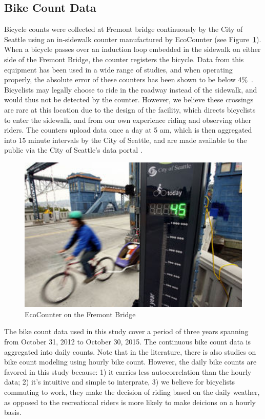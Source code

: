 \documentclass [11pt, proquest] {uwthesis}[2015/03/03]
\begin{document}
\subsection{Bike Count Data}
Bicycle counts were collected at Fremont bridge continuously by the City of Seattle using an in-sidewalk counter manufactured by EcoCounter (see Figure~\ref{fig:ecoCounter}). When a bicycle passes over an induction loop embedded in the sidewalk on either side of the Fremont Bridge, the counter
registers the bicycle. Data from this equipment has been used in a wide range of studies, and when operating properly, the absolute error of these counters has been shown to be below 4\%~\cite{Nordback09}. Bicyclists may legally choose to ride in the roadway instead of the sidewalk, and would thus not be detected by the counter. However, we believe these crossings are rare at this location due to the design of the facility, which directs bicyclists to enter the sidewalk, and from our own experience riding and observing other riders. The counters upload data once a day at 5 am, which is then aggregated into 15 minute intervals by the City of Seattle, and are made available to the public via the City of Seattle's data portal \cite{City-of-Seattle:aa,City-of-Seattle:ab}.

\begin{figure}
   \includegraphics[width=1\textwidth]{figures/FremontBikeEcoCounter.jpg} 
  \caption{EcoCounter on the Fremont Bridge}
  \label{fig:ecoCounter}
\end{figure}

The bike count data used in this study cover a period of three years spanning from October 31, 2012 to October 30, 2015. The continuous bike count data is aggregated into daily counts. Note that in the literature, there is also studies on bike count modeling using hourly bike count. However, the daily bike counts are favored in this study because: 1) it carries less autocorrelation than the hourly data; 2) it's intuitive and simple to interprate, 3) we believe for bicyclists commuting to work, they make the decision of riding based on the daily weather, as opposed to the recreational riders is more likely to make deicions on a hourly basis. 
\end{document}
